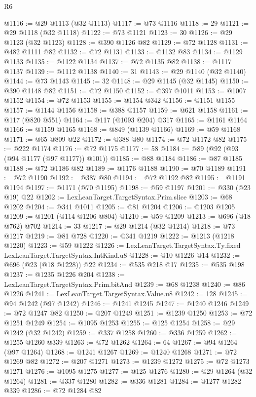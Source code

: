 \begin{lexlean}{R6}
\begin{coremodule}
@1116 := @29 @1113 (@32 @1113)
@1117 := @73 @1116
@1118 := 29
@1121 := @29 @1118 (@32 @1118)
@1122 := @73 @1121
@1123 := 30
@1126 := @29 @1123 (@32 @1123)
@1128 := @390 @1126 @82
@1129 := @72 @1128
@1131 := @482 @1111 @82
@1132 := @72 @1131
@1133 := @1132 @83
@1134 := @1129 @1133
@1135 := @1122 @1134
@1137 := @72 @1135 @82
@1138 := @1117 @1137
@1139 := @1112 @1138
@1140 := 31
@1143 := @29 @1140 (@32 @1140)
@1144 := @73 @1143
@1145 := 32
@1148 := @29 @1145 (@32 @1145)
@1150 := @390 @1148 @82
@1151 := @72 @1150
@1152 := @397 @1011
@1153 := @1007 @1152
@1154 := @72 @1153
@1155 := @1154 @342
@1156 := @1151 @1155
@1157 := @1144 @1156
@1158 := @388 @1157
@1159 := @621 @1158
@1161 := @117 (@820 @551)
@1164 := @117 (@1093 @204) @317
@1165 := @1161 @1164
@1166 := @1159 @1165
@1168 := @849 (@1139 @1166)
@1169 := @59 @1168
@1171 := @65 @809 @22
@1172 := @388 @80
@1174 := @72 @1172 @82
@1175 := @222 @1174
@1176 := @72 @1175
@1177 := 58
@1184 := @89 (@92 (@93 (@94 @1177 (@97 @1177)) @101))
@1185 := @88 @1184
@1186 := @87 @1185
@1188 := @72 @1186 @82
@1189 := @1176 @1188
@1190 := @70 @1189
@1191 := @72 @1190
@1192 := @387 @80
@1194 := @72 @1192 @82
@1195 := @1191 @1194
@1197 := @1171 (@70 @1195)
@1198 := @59 @1197
@1201 := @330 (@23 @19) @22
@1202 := LexLeanTarget.TargetSyntax.Prim.slice
@1203 := @68 @1202
@1204 := @341 @1011
@1205 := @81 @1204
@1206 := @1203 @1205
@1209 := @1201 (@114 @1206 @804)
@1210 := @59 @1209
@1213 := @696 (@18 @762) @702
@1214 := 33
@1217 := @29 @1214 (@32 @1214)
@1218 := @73 @1217
@1219 := @81 @728
@1220 := @341 @1219
@1222 := @1213 (@1218 @1220)
@1223 := @59 @1222
@1226 := LexLeanTarget.TargetSyntax.Ty.fixed LexLeanTarget.TargetSyntax.IntKind.u8
@1228 := @10 @1226 @14
@1232 := @696 (@23 (@18 @1228)) @22
@1234 := @535 @218 @17
@1235 := @535 @198
@1237 := @1235 @1226 @204
@1238 := LexLeanTarget.TargetSyntax.Prim.bitAnd
@1239 := @68 @1238
@1240 := @86 @1226
@1241 := LexLeanTarget.TargetSyntax.Value.u8
@1242 := 128
@1245 := @94 @1242 (@97 @1242)
@1246 := @1241 @1245
@1247 := @1240 @1246
@1249 := @72 @1247 @82
@1250 := @207 @1249
@1251 := @1239 @1250
@1253 := @72 @1251 @1249
@1254 := @1095 @1253
@1255 := @125 @1254
@1258 := @29 @1242 (@32 @1242)
@1259 := @337 @1258
@1260 := @336 @1259
@1262 := @1255 @1260 @339
@1263 := @72 @1262
@1264 := 64
@1267 := @94 @1264 (@97 @1264)
@1268 := @1241 @1267
@1269 := @1240 @1268
@1271 := @72 @1269 @82
@1272 := @207 @1271
@1273 := @1239 @1272
@1275 := @72 @1273 @1271
@1276 := @1095 @1275
@1277 := @125 @1276
@1280 := @29 @1264 (@32 @1264)
@1281 := @337 @1280
@1282 := @336 @1281
@1284 := @1277 @1282 @339
@1286 := @72 @1284 @82

\end{coremodule}
\end{lexlean}

